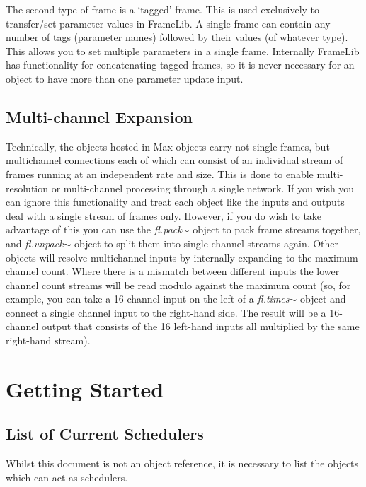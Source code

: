 \documentclass{article}
\newcommand{\flobject}[1]{\textit{fl.#1$\sim$}}
\begin{document}
The second type of frame is a `tagged' frame. This is used exclusively to transfer/set parameter values in FrameLib. A single frame can contain any number of tags (parameter names) followed by their values (of whatever type). This allows you to set multiple parameters in a single frame. Internally FrameLib has functionality for concatenating tagged frames, so it is never necessary for an object to have more than one parameter update input.  

\subsection{Multi-channel Expansion}

Technically, the objects hosted in Max objects carry not single frames, but multichannel connections each of which can consist of an individual stream of frames running at an independent rate and size. This is done to enable multi-resolution or multi-channel processing through a single network. If you wish you can ignore this functionality and treat each object like the inputs and outputs deal with a single stream of frames only. However, if you do wish to take advantage of this you can use the \flobject{pack} object to pack frame streams together, and \flobject{unpack} object to split them into single channel streams again. Other objects will resolve multichannel inputs by internally expanding to the maximum channel count. Where there is a mismatch between different inputs the lower channel count streams will be read modulo against the maximum count (so, for example, you can take a 16-channel input on the left of a \flobject{times} object and connect a single channel input to the right-hand side. The result will be a 16-channel output that consists of the 16 left-hand inputs all multiplied by the same right-hand stream).
\pagebreak

\section{Getting Started}
\vspace{0.1in}

\subsection{List of Current Schedulers}

Whilst this document is not an object reference, it is necessary to list the objects which can act as schedulers.
\end{document}

